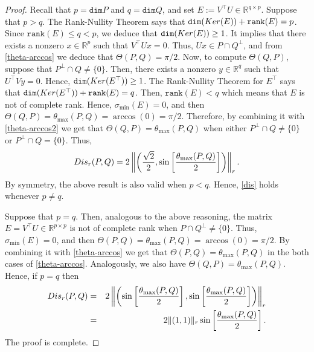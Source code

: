 \documentclass[10pt,a4paper]{amsart}
\newcommand{\R}{\mathbb R}
\begin{document}
\begin{proof}
Recall that $p=\mathtt{dim} P$ and $q=\mathtt{dim} Q$, and set $E:=V^\top U\in\R^{q\times p}$. Suppose that $p>q $. The Rank-Nullity Theorem says that $\mathtt{dim}({\rm Ker}(E))+\mathtt{rank}(E)=p$. Since $\mathtt{rank}(E)\leq q<p$, we deduce that $\mathtt{dim}({\rm Ker}(E))\geq 1$. It implies that there exists a nonzero $x\in\R^p$ such that $V^\top U x=0$. Thus, $Ux\in P\cap Q^\perp$, and from \eqref{theta-arccos} we deduce that $\Theta(P,Q)=\pi/2$. Now, to compute $\Theta(Q,P)$, suppose that $P^\perp\cap Q\neq\{0\}$. Then, there exists a nonzero $y\in\R^q$ such that $U^\top Vy=0$. Hence, $\mathtt{dim}({\rm Ker}(E^\top))\geq 1$. The Rank-Nullity Theorem for $E^\top$ says that $\mathtt{dim}({\rm Ker}(E^\top))+\mathtt{rank}(E)=q$. Then, $\mathtt{rank}(E)<q$ which means that $E$ is not of complete rank. Hence, $\sigma_{\min}(E)=0$, and then $\Theta(Q,P)=\theta_{\max}(P,Q)=\arccos(0)=\pi/2$. Therefore, by combining it with \eqref{theta-arccos2} we get that $\Theta(Q,P)=\theta_{\max}(P,Q)$ when either $P^\perp\cap Q\neq\{0\}$ or $P^\perp\cap Q=\{0\}$. Thus, 
\begin{equation}\label{dis}
\displaystyle {\rm Dis}_r(P,Q)= 2\left\Vert\left(\frac{\sqrt{2}}{2}, \sin\left[\frac{\theta_{\max}(P,Q)}{2}\right]\right)\right\Vert_r.
\end{equation}
By symmetry, the above result is also valid when $p<q$. Hence, \eqref{dis} holds whenever $p\neq q$.

Suppose that $p=q$. Then, analogous to the above reasoning, the matrix $E=V^\top U\in\R^{p\times p}$ is not of complete rank when $P\cap Q^\perp\neq\{0\}$. Thus, $\sigma_{\min}(E)=0$, and then $\Theta(P,Q)=\theta_{\max}(P,Q)=\arccos(0)=\pi/2$. By combining it with \eqref{theta-arccos} we get that $\Theta(P,Q)=\theta_{\max}(P,Q)$ in the both cases of \eqref{theta-arccos}. Analogously, we also have $\Theta(Q,P)=\theta_{\max}(P,Q)$. Hence, if $p=q$ then
\begin{eqnarray*}
\displaystyle {\rm Dis}_r(P,Q)&=& 2\left\Vert\left(\sin\left[\frac{\theta_{\max}(P,Q)}{2}\right], \sin\left[\frac{\theta_{\max}(P,Q)}{2}\right]\right)\right\Vert_r\\
&=&2\Vert(1,1)\Vert_r\sin\left[\frac{\theta_{\max}(P,Q)}{2}\right].
\end{eqnarray*}
The proof is complete.
\end{proof}
\end{document}
